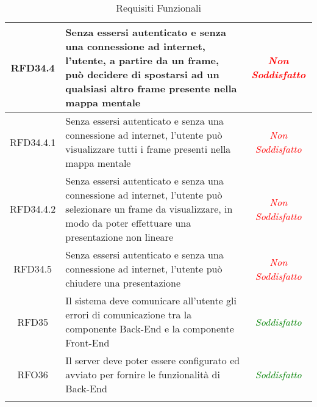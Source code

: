 \begin{longtable}{|c|>{\centering}m{7cm}|c|}
\hypertarget{RFD34.4}{RFD34.4} & Senza essersi autenticato e senza una connessione ad internet, l’utente, a partire da un frame, può decidere di spostarsi ad un qualsiasi altro frame presente nella mappa mentale & \textcolor{Red}{\textit{Non Soddisfatto}}\\ \hline
\hypertarget{RFD34.4.1}{RFD34.4.1} & Senza essersi autenticato e senza una connessione ad internet, l’utente può visualizzare tutti i frame presenti nella mappa mentale & \textcolor{Red}{\textit{Non Soddisfatto}}\\ \hline
\hypertarget{RFD34.4.2}{RFD34.4.2} & Senza essersi autenticato e senza una connessione ad internet, l’utente può selezionare un frame da visualizzare, in modo da poter effettuare una presentazione non lineare & \textcolor{Red}{\textit{Non Soddisfatto}}\\ \hline
\hypertarget{RFD34.5}{RFD34.5} & Senza essersi autenticato e senza una connessione ad internet, l’utente può chiudere una presentazione & \textcolor{Red}{\textit{Non Soddisfatto}}\\ \hline
\hypertarget{RFD35}{RFD35} & Il sistema deve comunicare all'utente gli errori di comunicazione tra la componente Back-End e la componente Front-End & \textcolor{Green}{\textit{Soddisfatto}}\\ \hline
\hypertarget{RFO36}{RFO36} & Il server deve poter essere configurato ed avviato per fornire le funzionalità di Back-End & \textcolor{Green}{\textit{Soddisfatto}}\\ \hline
\caption[Requisiti Funzionali]{Requisiti Funzionali}
\label{tabella:req0}
\end{longtable}
\clearpage

